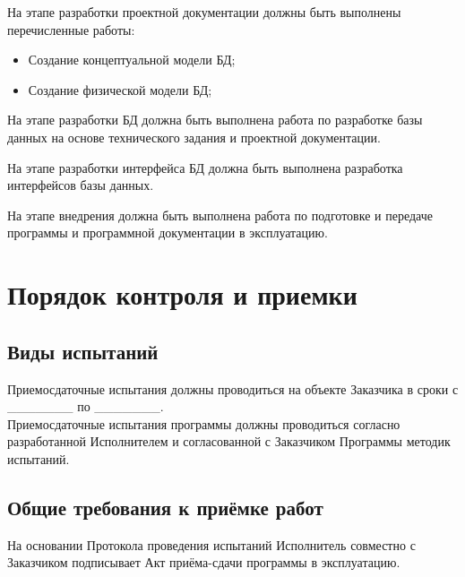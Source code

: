     На этапе разработки проектной документации должны быть выполнены перечисленные работы:
      \begin{itemize}
        \item Создание концептуальной модели БД;
        \item Создание физической модели БД;
      \end{itemize}
      
    На этапе разработки БД должна быть выполнена работа по разработке базы данных на основе технического задания и проектной документации.

    На этапе разработки интерфейса БД должна быть выполнена разработка интерфейсов базы данных.

    На этапе внедрения должна быть выполнена работа по подготовке и передаче программы и программной документации в эксплуатацию.

\section{Порядок контроля и приемки}
  \subsection{Виды испытаний}
    Приемосдаточные испытания должны проводиться на объекте Заказчика в сроки с _______ по _______.\\
    Приемосдаточные испытания программы должны проводиться согласно разработанной Исполнителем и согласованной с Заказчиком Программы методик испытаний.
  \subsection{Общие требования к приёмке работ}
    На основании Протокола проведения испытаний Исполнитель совместно с Заказчиком подписывает Акт приёма-сдачи программы в эксплуатацию.
\endinput
